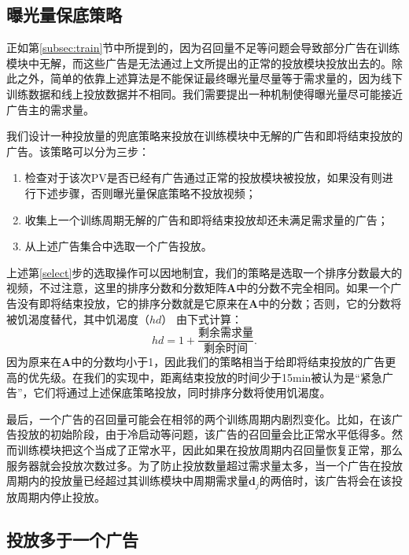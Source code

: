 \subsection{曝光量保底策略} \label{subsec:guarantee}

正如第\ref{subsec:train}节中所提到的，因为召回量不足等问题会导致部分广告在训练模块中无解，而这些广告是无法通过上文所提出的正常的投放模块投放出去的。除此之外，简单的依靠上述算法是不能保证最终曝光量尽量等于需求量的，因为线下训练数据和线上投放数据并不相同。我们需要提出一种机制使得曝光量尽可能接近广告主的需求量。

我们设计一种投放量的兜底策略来投放在训练模块中无解的广告和即将结束投放的广告。该策略可以分为三步：
\begin{enumerate}
	\item 检查对于该次PV是否已经有广告通过正常的投放模块被投放，如果没有则进行下述步骤，否则曝光量保底策略不投放视频；
	\item 收集上一个训练周期无解的广告和即将结束投放却还未满足需求量的广告；
	\item 从上述广告集合中选取一个广告投放。\label{select}
\end{enumerate}

上述第\ref{select}步的选取操作可以因地制宜，我们的策略是选取一个排序分数最大的视频，不过注意，这里的排序分数和分数矩阵$\bm{A}$中的分数不完全相同。如果一个广告没有即将结束投放，它的排序分数就是它原来在$\bm{A}$中的分数；否则，它的分数将被饥渴度替代，其中饥渴度（$hd$）
由下式计算：
\begin{equation}
	hd = 1 + \frac{\text{剩余需求量}}{\text{剩余时间}}.
\end{equation}
因为原来在$\bm{A}$中的分数均小于1，因此我们的策略相当于给即将结束投放的广告更高的优先级。在我们的实现中，距离结束投放的时间少于15min被认为是“紧急广告”，它们将通过上述保底策略投放，同时排序分数将使用饥渴度。

最后，一个广告的召回量可能会在相邻的两个训练周期内剧烈变化。比如，在该广告投放的初始阶段，由于冷启动等问题，该广告的召回量会比正常水平低得多。然而训练模块把这个当成了正常水平，因此如果在投放周期内召回量恢复正常，那么服务器就会投放次数过多。为了防止投放数量超过需求量太多，当一个广告在投放周期内的投放量已经超过其训练模块中周期需求量$\bm{d}_j$的两倍时，该广告将会在该投放周期内停止投放。

\subsection{投放多于一个广告} \label{subsec:more_than_one}

